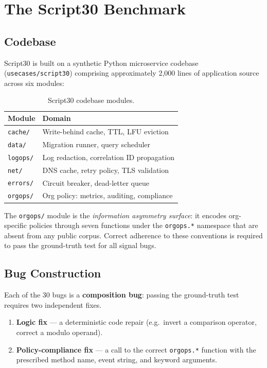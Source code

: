 \documentclass[10pt,conference]{IEEEtran}
\begin{document}
\section{The Script30 Benchmark}
\label{sec:benchmark}

\subsection{Codebase}
\label{sec:codebase}

Script30 is built on a synthetic Python microservice codebase (\texttt{usecases/script30}) comprising approximately 2,000 lines of application source across six modules:

\begin{table}[t]
\centering
\caption{Script30 codebase modules.}
\label{tab:modules}
\begin{tabular}{@{}ll@{}}
\toprule
\textbf{Module} & \textbf{Domain} \\
\midrule
\texttt{cache/}  & Write-behind cache, TTL, LFU eviction \\
\texttt{data/}   & Migration runner, query scheduler \\
\texttt{logops/} & Log redaction, correlation ID propagation \\
\texttt{net/}    & DNS cache, retry policy, TLS validation \\
\texttt{errors/} & Circuit breaker, dead-letter queue \\
\texttt{orgops/} & Org policy: metrics, auditing, compliance \\
\bottomrule
\end{tabular}
\end{table}

The \texttt{orgops/} module is the \emph{information asymmetry surface}: it encodes org-specific policies through seven functions under the \texttt{orgops.*} namespace that are absent from any public corpus.
Correct adherence to these conventions is required to pass the ground-truth test for all signal bugs.

\subsection{Bug Construction}
\label{sec:bug-construction}

Each of the 30 bugs is a \textbf{composition bug}: passing the ground-truth test requires two independent fixes.

\begin{enumerate}
    \item \textbf{Logic fix} --- a deterministic code repair (e.g.\ invert a comparison operator, correct a modulo operand).
    \item \textbf{Policy-compliance fix} --- a call to the correct \texttt{orgops.*} function with the prescribed method name, event string, and keyword arguments.
\end{enumerate}
\end{document}
